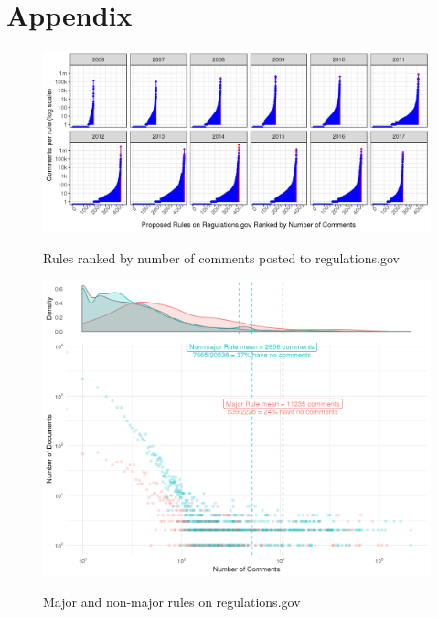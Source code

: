\documentclass{article}
\begin{document}
\newpage
\section{Appendix}

\begin{figure}[h!]
    \centering
        \caption{Rules ranked by number of comments posted to regulations.gov}
    \includegraphics[width = 6.5in]{Figs/rules-ranked-comments-per-year-1.png}
    \label{fig:rules-ranked}
\end{figure}

\begin{figure}[p!]
    \centering
        \caption{Major and non-major rules on regulations.gov}
    \includegraphics[width = 7in]{Figs/major-comments-density-1.png}
    \label{fig:rules-major}
\end{figure}
\end{document}
